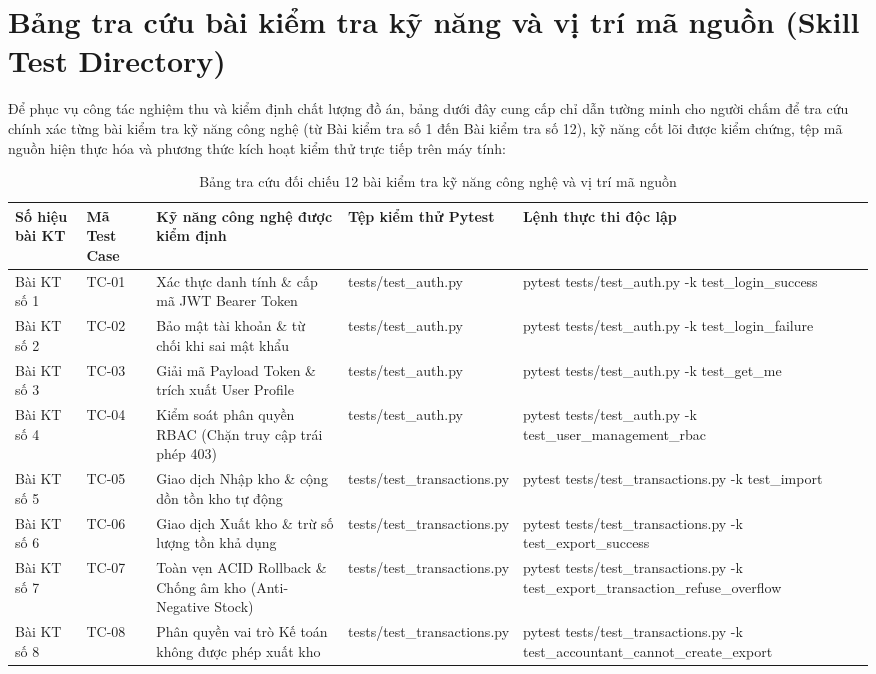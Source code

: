 \section{Bảng tra cứu bài kiểm tra kỹ năng và vị trí mã nguồn (Skill Test Directory)}

Để phục vụ công tác nghiệm thu và kiểm định chất lượng đồ án, bảng dưới đây cung cấp chỉ dẫn tường minh cho người chấm để tra cứu chính xác từng bài kiểm tra kỹ năng công nghệ (từ Bài kiểm tra số 1 đến Bài kiểm tra số 12), kỹ năng cốt lõi được kiểm chứng, tệp mã nguồn hiện thực hóa và phương thức kích hoạt kiểm thử trực tiếp trên máy tính:

\begin{table}[h!]
\centering
\caption{Bảng tra cứu đối chiếu 12 bài kiểm tra kỹ năng công nghệ và vị trí mã nguồn}
\begin{tabular}{|l|l|l|l|l|}
\hline
\rowcolor{tablehead}
\textbf{Số hiệu bài KT} & \textbf{Mã Test Case} & \textbf{Kỹ năng công nghệ được kiểm định} & \textbf{Tệp kiểm thử Pytest} & \textbf{Lệnh thực thi độc lập} \\ \hline
Bài KT số 1 & TC-01 & Xác thực danh tính \& cấp mã JWT Bearer Token & tests/test\_auth.py & pytest tests/test\_auth.py -k test\_login\_success \\ \hline
Bài KT số 2 & TC-02 & Bảo mật tài khoản \& từ chối khi sai mật khẩu & tests/test\_auth.py & pytest tests/test\_auth.py -k test\_login\_failure \\ \hline
Bài KT số 3 & TC-03 & Giải mã Payload Token \& trích xuất User Profile & tests/test\_auth.py & pytest tests/test\_auth.py -k test\_get\_me \\ \hline
Bài KT số 4 & TC-04 & Kiểm soát phân quyền RBAC (Chặn truy cập trái phép 403) & tests/test\_auth.py & pytest tests/test\_auth.py -k test\_user\_management\_rbac \\ \hline
Bài KT số 5 & TC-05 & Giao dịch Nhập kho \& cộng dồn tồn kho tự động & tests/test\_transactions.py & pytest tests/test\_transactions.py -k test\_import \\ \hline
Bài KT số 6 & TC-06 & Giao dịch Xuất kho \& trừ số lượng tồn khả dụng & tests/test\_transactions.py & pytest tests/test\_transactions.py -k test\_export\_success \\ \hline
Bài KT số 7 & TC-07 & Toàn vẹn ACID Rollback \& Chống âm kho (Anti-Negative Stock) & tests/test\_transactions.py & pytest tests/test\_transactions.py -k test\_export\_transaction\_refuse\_overflow \\ \hline
Bài KT số 8 & TC-08 & Phân quyền vai trò Kế toán không được phép xuất kho & tests/test\_transactions.py & pytest tests/test\_transactions.py -k test\_accountant\_cannot\_create\_export \\ \hline

\end{tabular}
\end{table}
